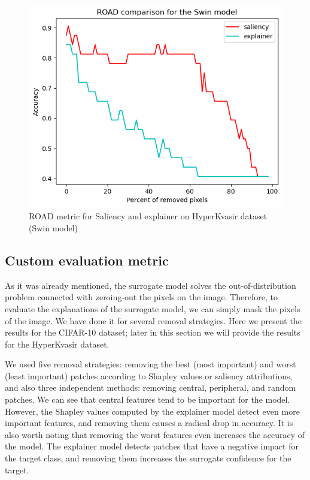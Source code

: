 \documentclass[magisterska,en]{pracamgr}
\begin{document}
\begin{figure}[H]
\centering
\includegraphics[scale=0.5]{./images/ROAD_gastro_swin.png}
\caption{ROAD metric for Saliency and explainer on HyperKvasir dataset (Swin model)}
\label{ROAD_gastro_swin}
\end{figure}










\subsection{Custom evaluation metric}

As it was already mentioned, the surrogate model solves the out-of-distribution problem connected with zeroing-out the pixels on the image. Therefore, to evaluate the explanations of the surrogate model, we can simply mask the pixels of the image. We have done it for several removal strategies. Here we present the results for the CIFAR-10 dataset; later in this section we will provide the results for the HyperKvasir dataset.




We used five removal strategies: removing the best (most important) and worst (least important) patches according to Shapley values or saliency attributions, and also three independent methods: removing central, peripheral, and random patches. We can see that central features tend to be important for the model. However, the Shapley values computed by the explainer model detect even more important features, and removing them causes a radical drop in accuracy. It is also worth noting that removing the worst features even increases the accuracy of the model. The explainer model detects patches that have a negative impact for the target class, and removing them increases the surrogate confidence for the target.
\end{document}
